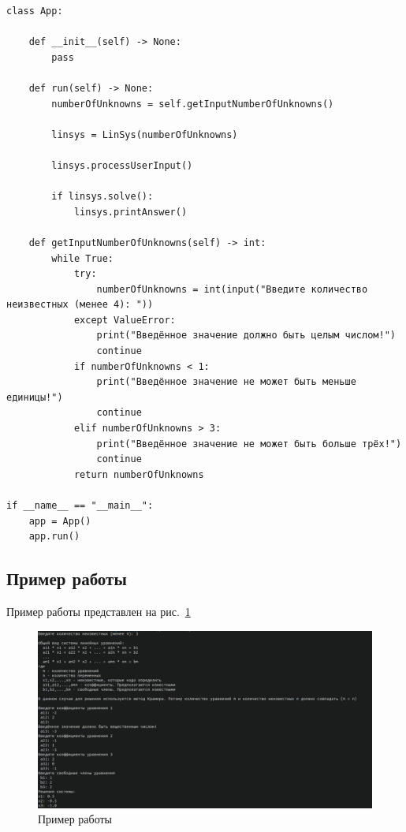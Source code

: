 \documentclass[12pt,a4paper]{scrartcl}
\begin{document}
\begin{verbatim}
class App:
    
    def __init__(self) -> None:
        pass

    def run(self) -> None:
        numberOfUnknowns = self.getInputNumberOfUnknowns()

        linsys = LinSys(numberOfUnknowns)

        linsys.processUserInput()

        if linsys.solve():
            linsys.printAnswer()
    
    def getInputNumberOfUnknowns(self) -> int:
        while True:
            try:
                numberOfUnknowns = int(input("Введите количество неизвестных (менее 4): "))
            except ValueError:
                print("Введённое значение должно быть целым числом!")
                continue
            if numberOfUnknowns < 1:
                print("Введённое значение не может быть меньше единицы!")
                continue
            elif numberOfUnknowns > 3:
                print("Введённое значение не может быть больше трёх!")
                continue
            return numberOfUnknowns

if __name__ == "__main__":
    app = App()
    app.run()
\end{verbatim}

\subsection{Пример работы}
\label{sec:example}
Пример работы представлен на рис.~\ref{fig:wex}
\begin{figure}[h]
	\centering
	\includegraphics[width=1\textwidth]{example.png}
	\caption{Пример работы}\label{fig:wex}
\end{figure}
\end{document}
